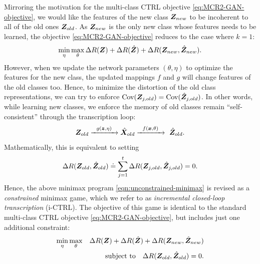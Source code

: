 \documentclass[../../book-main.tex]{subfiles}
\begin{document}
Mirroring the motivation for the multi-class CTRL objective \eqref{eq:MCR2-GAN-objective}, we would like the features of the new class $\bm{Z}_{new}$ to be incoherent to all of the old ones $\bm{Z}_{old}$. As $\bm{Z}_{new}$ is the only new class whose features needs to be learned, the objective \eqref{eq:MCR2-GAN-objective} reduces to the case where $k=1$:
\begin{equation}
\min_\eta \max_\theta \Delta{R(\bm{Z})}+\Delta{R(\hat{\bm{Z}})}+\Delta{R(\bm{Z}_{new},\hat{\bm{Z}}_{new})}.
\label{eqn:unconstrained-minimax}
\end{equation}
However, when we update the network parameters $(\theta, \eta)$ to optimize the features for the new class, the updated mappings $f$ and $g$ will change features of the old classes too. Hence, to minimize the distortion of the old class representations, we can try to enforce $\mbox{Cov}(\bm{Z}_{j,old}) = \mbox{Cov}(\hat{\bm{Z}}_{j,old})$. In other words, while learning new classes, we enforce the memory of old classes remain ``self-consistent'' through the transcription loop:
\begin{equation}
\bm{Z}_{old} \xrightarrow{\hspace{2mm} g(\bm{z},\eta) \hspace{2mm}} \hat {\bm{X}}_{old} \xrightarrow{\hspace{2mm} f(\bm{x}, \theta)\hspace{2mm}} \ \hat {\bm{Z}}_{old}.
\end{equation}
Mathematically, this is equivalent to setting 
$$\Delta R(\bm{Z}_{old},\hat{\bm{Z}}_{old}) \doteq  \sum_{j=1}^t \Delta R(\bm{Z}_{j,old},\hat{\bm{Z}}_{j,old}) = 0.$$  
Hence, the above minimax program \eqref{eqn:unconstrained-minimax} is revised as a {\em constrained} minimax game, which we refer to as  {\em incremental closed-loop transcription} (i-CTRL).
The objective of this game is identical to the standard multi-class CTRL objective \eqref{eq:MCR2-GAN-objective}, but includes just one additional constraint:
\begin{eqnarray}
\min_\eta \max_\theta  &&\Delta{R(\bm{Z})}+\Delta{R(\hat{\bm{Z}})}+\Delta{R(\bm{Z}_{new},\hat{\bm{Z}}_{new})} \nonumber\\
&& \mbox{subject to} \quad  \Delta R(\bm{Z}_{old},\hat{\bm{Z}}_{old}) = 0.
\label{eqn:constrained-minimax}
\end{eqnarray}
\end{document}
